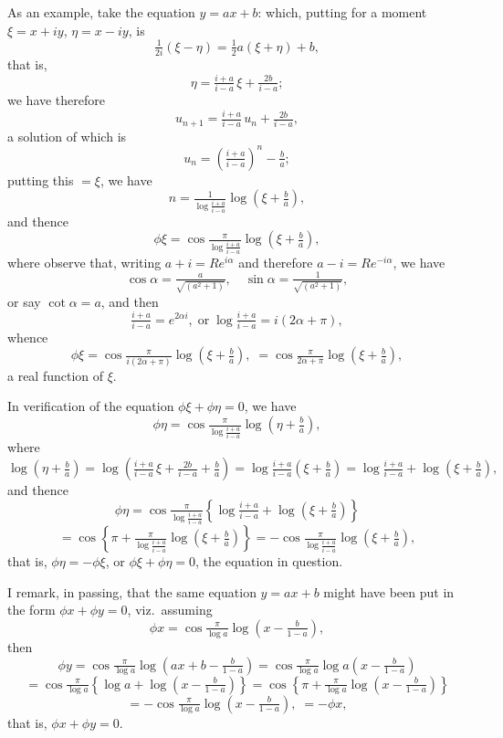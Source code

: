 \documentclass[11pt]{article}
\begin{document}
As an example, take the equation $y = ax + b$: which, putting for a moment $\xi = x + iy$, $\eta = x - iy$, is
\[ \tfrac{1}{2i}(\xi - \eta) = \tfrac{1}{2}a(\xi + \eta) + b, \]
that is,
\[ \eta = \tfrac{i + a}{i - a}\,\xi + \tfrac{2b}{i - a}; \]
we have therefore
\[ u_{n+1} = \tfrac{i + a}{i - a}\,u_{n} + \tfrac{2b}{i - a}, \]
a solution of which is
\[ u_{n} = \left(\tfrac{i + a}{i - a}\right)^{n} - \tfrac{b}{a}; \]
putting this $= \xi$, we have
\[ n = \tfrac{1}{\log\tfrac{i + a}{i - a}}\log\!\left(\xi + \tfrac{b}{a}\right), \]
and thence
\[ \phi\xi = \cos\tfrac{\pi}{\log\tfrac{i + a}{i - a}}\log\!\left(\xi + \tfrac{b}{a}\right), \]
where observe that, writing $a + i = Re^{i\alpha}$ and therefore $a - i = Re^{-i\alpha}$, we have
\[ \cos\alpha = \tfrac{a}{\sqrt{(a^{2} + 1)}},\quad \sin\alpha = \tfrac{1}{\sqrt{(a^{2} + 1)}}, \]
or say $\cot\alpha = a$, and then
\[ \tfrac{i + a}{i - a} = e^{2\alpha i},\;\text{or}\;\log\tfrac{i + a}{i - a} = i(2\alpha + \pi), \]
whence
\[ \phi\xi = \cos\tfrac{\pi}{i(2\alpha + \pi)}\log\!\left(\xi + \tfrac{b}{a}\right),\;= \cos\tfrac{\pi}{2\alpha + \pi}\log\!\left(\xi + \tfrac{b}{a}\right), \]
a real function of $\xi$.

In verification of the equation $\phi\xi + \phi\eta = 0$, we have
\[ \phi\eta = \cos\tfrac{\pi}{\log\tfrac{i + a}{i - a}}\log\!\left(\eta + \tfrac{b}{a}\right), \]
where
\[ \log\!\left(\eta + \tfrac{b}{a}\right) = \log\!\left(\tfrac{i + a}{i - a}\,\xi + \tfrac{2b}{i - a} + \tfrac{b}{a}\right) = \log\tfrac{i + a}{i - a}\!\left(\xi + \tfrac{b}{a}\right) = \log\tfrac{i + a}{i - a} + \log\!\left(\xi + \tfrac{b}{a}\right), \]
and thence
\[ \phi\eta = \cos\tfrac{\pi}{\log\tfrac{i + a}{i - a}}\!\left\{\log\tfrac{i + a}{i - a} + \log\!\left(\xi + \tfrac{b}{a}\right)\right\} \]
\[ = \cos\!\left\{\pi + \tfrac{\pi}{\log\tfrac{i + a}{i - a}}\log\!\left(\xi + \tfrac{b}{a}\right)\right\} = -\cos\tfrac{\pi}{\log\tfrac{i + a}{i - a}}\log\!\left(\xi + \tfrac{b}{a}\right), \]
that is, $\phi\eta = -\phi\xi$, or $\phi\xi + \phi\eta = 0$, the equation in question.

I remark, in passing, that the same equation $y = ax + b$ might have been put in the form $\phi x + \phi y = 0$, viz.\ assuming
\[ \phi x = \cos\tfrac{\pi}{\log a}\log\!\left(x - \tfrac{b}{1 - a}\right), \]
then
\[ \phi y = \cos\tfrac{\pi}{\log a}\log\!\left(ax + b - \tfrac{b}{1 - a}\right) = \cos\tfrac{\pi}{\log a}\log a\!\left(x - \tfrac{b}{1 - a}\right) \]
\[ = \cos\tfrac{\pi}{\log a}\!\left\{\log a + \log\!\left(x - \tfrac{b}{1 - a}\right)\right\} = \cos\!\left\{\pi + \tfrac{\pi}{\log a}\log\!\left(x - \tfrac{b}{1 - a}\right)\right\} \]
\[ = -\cos\tfrac{\pi}{\log a}\log\!\left(x - \tfrac{b}{1 - a}\right),\; = -\phi x, \]
that is, $\phi x + \phi y = 0$.
\end{document}
